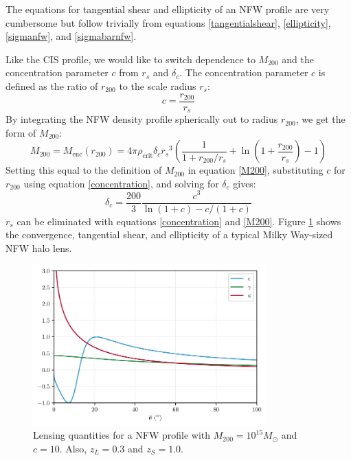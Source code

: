 \documentclass[10pt]{article}
\begin{document}
The equations for tangential shear and ellipticity of an NFW profile are very cumbersome but follow trivially from equations \ref{tangentialshear}, \ref{ellipticity}, \ref{sigmanfw}, and \ref{sigmabarnfw}.

Like the CIS profile, we would like to switch dependence to $M_{200}$ and the concentration parameter $c$ from $r_s$ and $\delta_c$. The concentration parameter $c$ is defined as the ratio of $r_{200}$ to the scale radius $r_s$:
\begin{equation} \label{concentration}
c = \frac{r_{200}}{r_s}
\end{equation}
By integrating the NFW density profile spherically out to radius $r_{200}$, we get the form of $M_{200}$:
\begin{equation} \label{nfwM200}
M_{200} = M_\mathrm{enc}(r_{200}) = 4 \pi \rho_\mathrm{crit} \delta_c {r_s}^3 \left( \frac{1}{1 + r_{200}/r_s} + \ln{\left(1 + \frac{r_{200}}{r_s} \right)} - 1 \right)
\end{equation}
Setting this equal to the definition of $M_{200}$ in equation \ref{M200}, substituting $c$ for $r_{200}$ using equation \ref{concentration}, and solving for $\delta_c$ gives:
\begin{equation}
\delta_c = \frac{200}{3} \frac{c^3}{\ln(1 + c) - c/(1 + c)}
\end{equation}
$r_s$ can be eliminated with equations \ref{concentration} and \ref{M200}. Figure \ref{nfwproperties} shows the convergence, tangential shear, and ellipticity of a typical Milky Way-sized NFW halo lens.

\begin{figure}
    \centering
    \includegraphics[width=0.8\textwidth]{nfwproperties.pdf}
    \caption{Lensing quantities for a NFW profile with $M_{200} = 10^{15} M_\odot$ and $c = 10$. Also,  $z_L = 0.3$ and $z_S = 1.0$.}
    \label{nfwproperties}
\end{figure}
\end{document}
